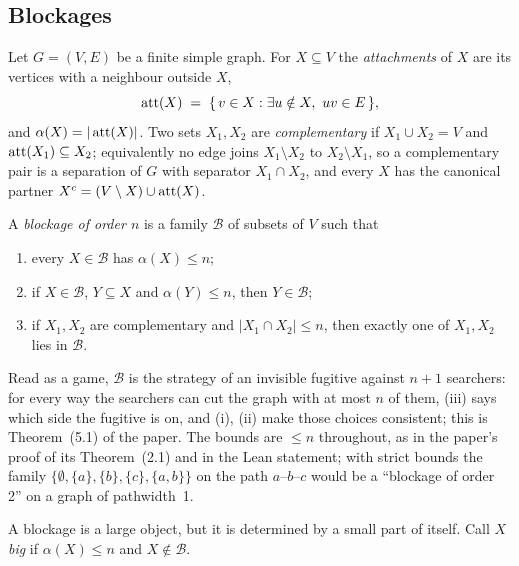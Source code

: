 \subsection{Blockages}

Let $G=(V,E)$ be a finite simple graph. For $X\subseteq V$ the
\emph{attachments} of $X$ are its vertices with a neighbour outside $X$,
\[
\operatorname{att}(X) \;=\; \{\,v\in X : \exists u\notin X,\ uv\in E\,\},
\]
and $\alpha(X)=|\operatorname{att}(X)|$. Two sets $X_1,X_2$ are \emph{complementary} if
$X_1\cup X_2=V$ and $\operatorname{att}(X_1)\subseteq X_2$; equivalently no edge joins
$X_1\setminus X_2$ to $X_2\setminus X_1$, so a complementary pair is a
separation of $G$ with separator $X_1\cap X_2$, and every $X$ has the
canonical partner $X^{c}=(V\setminus X)\cup\operatorname{att}(X)$.

\begin{definition}\label{def:blockage}
A \emph{blockage of order $n$} is a family $\mathcal B$ of subsets of $V$
such that
\begin{enumerate}
\item[(i)] every $X\in\mathcal B$ has $\alpha(X)\le n$;
\item[(ii)] if $X\in\mathcal B$, $Y\subseteq X$ and $\alpha(Y)\le n$, then $Y\in\mathcal B$;
\item[(iii)] if $X_1,X_2$ are complementary and $|X_1\cap X_2|\le n$, then
  exactly one of $X_1,X_2$ lies in $\mathcal B$.
\end{enumerate}
\end{definition}

Read as a game, $\mathcal B$ is the strategy of an invisible fugitive against
$n+1$ searchers: for every way the searchers can cut the graph with at most
$n$ of them, (iii) says which side the fugitive is on, and (i), (ii) make
those choices consistent; this is Theorem~(5.1) of the paper. The bounds are
$\le n$ throughout, as in the paper's proof of its Theorem~(2.1) and in the
Lean statement; with strict bounds the family
$\{\emptyset,\{a\},\{b\},\{c\},\{a,b\}\}$ on the path $a$--$b$--$c$ would be a
``blockage of order 2'' on a graph of pathwidth~1.

A blockage is a large object, but it is determined by a small part of
itself. Call $X$ \emph{big} if $\alpha(X)\le n$ and $X\notin\mathcal B$.

